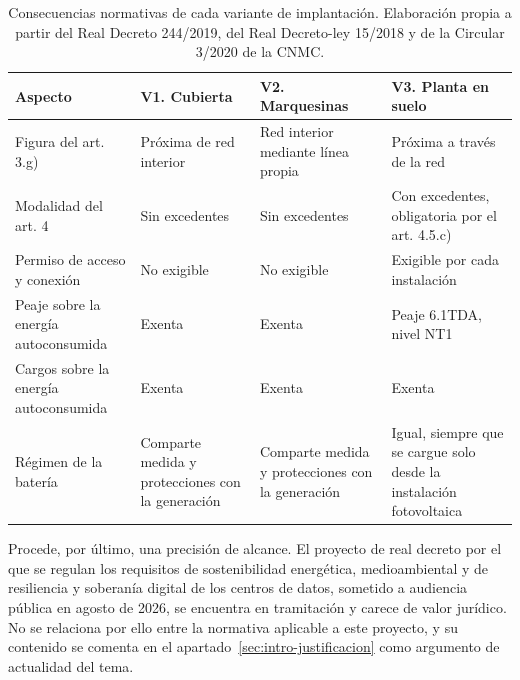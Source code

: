 \begin{table}[H]
    \centering
    \caption{Consecuencias normativas de cada variante de implantación. Elaboración propia a partir del Real Decreto 244/2019, del Real Decreto-ley 15/2018 y de la Circular 3/2020 de la CNMC.}
    \label{tab:norm-variantes}
    \begin{tabular}{@{}p{2.9cm}p{3.0cm}p{3.0cm}p{3.6cm}@{}}
        \hline
        \textbf{Aspecto} & \textbf{V1. Cubierta} & \textbf{V2. Marquesinas} & \textbf{V3. Planta en suelo} \\
        \hline
        Figura del art. 3.g) & Próxima de red interior & Red interior mediante línea propia & Próxima a través de la red \\
        Modalidad del art. 4 & Sin excedentes & Sin excedentes & Con excedentes, obligatoria por el art. 4.5.c) \\
        Permiso de acceso y conexión & No exigible & No exigible & Exigible por cada instalación \\
        Peaje sobre la energía autoconsumida & Exenta & Exenta & Peaje 6.1TDA, nivel NT1 \\
        Cargos sobre la energía autoconsumida & Exenta & Exenta & Exenta \\
        Régimen de la batería & Comparte medida y protecciones con la generación & Comparte medida y protecciones con la generación & Igual, siempre que se cargue solo desde la instalación fotovoltaica \\
        \hline
    \end{tabular}
\end{table}

Procede, por último, una precisión de alcance. El proyecto de real decreto por el que se regulan los requisitos de sostenibilidad energética, medioambiental y de resiliencia y soberanía digital de los centros de datos, sometido a audiencia pública en agosto de 2026, se encuentra en tramitación y carece de valor jurídico. No se relaciona por ello entre la normativa aplicable a este proyecto, y su contenido se comenta en el apartado~\ref{sec:intro-justificacion} como argumento de actualidad del tema.
